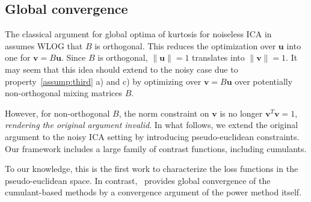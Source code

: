 \documentclass[letterpaper]{article}
\newcommand{\ba}[1]{\begin{align}#1\end{align}}
\newcommand{\bu}{\pmb{u}}
\newcommand{\bx}{\pmb{x}}
\newcommand{\by}{\pmb{y}}
\newcommand{\bg}{\pmb{g}}
\newcommand{\bv}{\pmb{v}}
\newcommand{\rd}{\color{red}}
\newcommand{\bk}{\color{black}}
\newcommand{\bb}[1]{\left(#1\right)}
\newcommand{\indep}{\perp \!\!\! \perp}
\begin{document}
\subsection{Global convergence}
\label{subsection:global_convergence}
The classical argument for global optima of kurtosis for noiseless ICA in~\cite{conf/icassp/DelfosseL96} assumes WLOG that $B$ is orthogonal. This reduces the optimization over $\bu$ into one for $\bv=B\bu$. Since $B$ is orthogonal, $\|\bu\|=1$ translates into $\|\bv\|=1$. It may seem that this idea should extend to the noisy case due to property~\ref{assump:third} a) and c) by optimizing over $\bv=B\bu$ over potentially non-orthogonal mixing matrices $B$.

However, for non-orthogonal $B$, the norm constraint on $\bv$ is no longer $\bv^T\bv=1$, \textit{rendering the original argument invalid}. In what follows, we extend the original argument to the noisy ICA setting by introducing pseudo-euclidean constraints. Our framework includes a large family of contrast functions, including cumulants. 

To our knowledge, this is the first work to characterize the loss functions in the pseudo-euclidean space. In contrast,~\cite{NIPS2013_4d2e7bd3} provides global convergence of the cumulant-based methods by a convergence argument of the power method itself.
\end{document}
